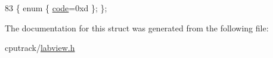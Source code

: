 \begin{DoxyCode}
83 \{ \textcolor{keyword}{enum} \{ \hyperlink{struct_l_v_data_type_3_01std_1_1complex_3_01double_01_4_01_4_a37d2b262a42ce4f252af70c7f95dc10aa3496678bd5469fe179bef82b9ffef476}{code}=0xd \}; \};
\end{DoxyCode}


The documentation for this struct was generated from the following file\+:\begin{DoxyCompactItemize}
\item 
cputrack/\hyperlink{labview_8h}{labview.\+h}\end{DoxyCompactItemize}
